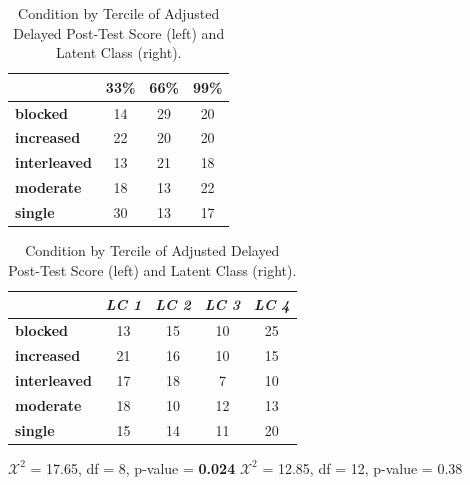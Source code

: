 \documentclass{edm_template}
\begin{document}
\begin{table}[hbtp]
\caption{Condition by Tercile of Adjusted Delayed Post-Test Score (left) and Latent Class (right).}
 \begin{center}
\begin{tabular}{|l || c | c | c |}
\hline
&33\%&66\%&99\%\\ \hline \hline
  \textbf{blocked}  &   14& 29& 20 \\ \hline
  \textbf{increased}&   22& 20& 20 \\ \hline
\textbf{interleaved}& 13& 21& 18 \\ \hline
  \textbf{moderate} &   18& 13& 22 \\ \hline
    \textbf{single} &      30& 13& 17 \\ \hline
 \end{tabular}
\label{default}
\quad
\begin{tabular}{|l || c | c | c | c |}
\hline
&\emph{LC 1}&\emph{LC 2}&\emph{LC 3}&\emph{LC 4}\\ \hline \hline
\textbf{blocked}&     13& 15& 10& 25\\ \hline
\textbf{increased}&   21& 16& 10& 15\\ \hline
\textbf{interleaved}& 17& 18&  7& 10\\ \hline
\textbf{moderate}&    18& 10& 12& 13\\ \hline
\textbf{single}&      15& 14& 11& 20\\ \hline
 \end{tabular}
 \end{center}
\hspace{60pt}$\mathcal{X}^2$ = 17.65, df = 8, p-value = {\bf 0.024} \hspace{30pt}$\mathcal{X}^2$ = 12.85, df = 12, p-value = 0.38
\label{default}
\end{table}
\end{document}
